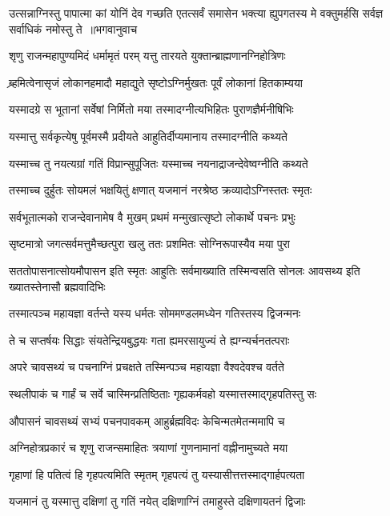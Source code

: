 \fourlineindentedshloka
{उत्सन्नाग्निस्तु पापात्मा कां योनिं देव गच्छति}
{एतत्सर्वं समासेन भक्त्या ह्युपगतस्य मे}
{वक्तुमर्हसि सर्वज्ञ सर्वाधिकं नमोस्तु ते ॥भगवानुवाच}
{}


\twolineshloka
{शृणु राजन्महापुण्यमिदं धर्मामृतं परम्}
{यत्तु तारयते युक्तान्ब्राह्मणानग्निहोत्रिणः}


\twolineshloka
{ब्र्हमित्वेनासृजं लोकानहमादौ महाद्युते}
{सृष्टोऽग्निर्मुखतः पूर्वं लोकानां हितकाम्यया}


\twolineshloka
{यस्मादग्रे स भूतानां सर्वेषां निर्मितो मया}
{तस्मादग्नीत्यभिहितः पुराणज्ञैर्मनीषिभिः}


\twolineshloka
{यस्मात्तु सर्वकृत्येषु पूर्वमस्मै प्रदीयते}
{आहुतिर्दीप्यमानाय तस्मादग्नीति कथ्यते}


\twolineshloka
{यस्माच्च तु नयत्यग्रां गतिं विप्रान्सुपूजितः}
{यस्माच्च नयनाद्राजन्देवेष्वग्नीति कथ्यते}


\twolineshloka
{तस्माच्च दुर्हुतः सोयमलं भक्षयितुं क्षणात्}
{यजमानं नरश्रेष्ठ क्रव्यादोऽग्निस्ततः स्मृतः}


\twolineshloka
{सर्वभूतात्मको राजन्देवानामेष वै मुखम्}
{प्रथमं मन्मुखात्सृष्टो लोकार्थे पचनः प्रभुः}


\twolineshloka
{सृष्टमात्रो जगत्सर्वमत्तुमैच्छत्पुरा खलु}
{ततः प्रशमितः सोग्निरूपास्यैव मया पुरा}


सततोपासनात्सोयमौपासन इति स्मृतः
\twolineshloka
{आहुतिः सर्वमाख्याति तस्मिन्वसति सोनलः}
{आवसथ्य इति ख्यातस्तेनासौ ब्रह्मवादिभिः}


\twolineshloka
{तस्मात्पञ्च महायज्ञा वर्तन्ते यस्य धर्मतः}
{सोममण्डलमध्येन गतिस्तस्य द्विजन्मनः}


\twolineshloka
{ते च सप्तर्षयः सिद्धाः संयतेन्द्रियबुद्धयः}
{गता ह्यमरसायुज्यं ते ह्यग्न्यर्चनतत्पराः}


\twolineshloka
{अपरे चावसथ्यं च पचनाग्निं प्रचक्षते}
{तस्मिन्पञ्च महायज्ञा वैश्वदेवश्च वर्तते}


\twolineshloka
{स्थलीपाकं च गार्हं च सर्वे चास्मिन्प्रतिष्ठिताः}
{गृह्यकर्मवहो यस्मात्तस्माद्गृहपतिस्तु सः}


\twolineshloka
{औपासनं चावसथ्यं सभ्यं पचनपावकम्}
{आहुर्ब्रह्मविदः केचिन्मतमेतन्ममापि च}


\twolineshloka
{अग्निहोत्रप्रकारं च शृणु राजन्समाहितः}
{त्रयाणां गुणनामानां वह्नीनामुच्यते मया}


\twolineshloka
{गृहाणां हि पतित्वं हि गृहपत्यमिति स्मृतम्}
{गृहपत्यं तु यस्यासीत्तत्तस्माद्गार्हपत्यता}


\twolineshloka
{यजमानं तु यस्मात्तु दक्षिणां तु गतिं नयेत्}
{दक्षिणाग्निं तमाहुस्ते दक्षिणायतनं द्विजाः}


